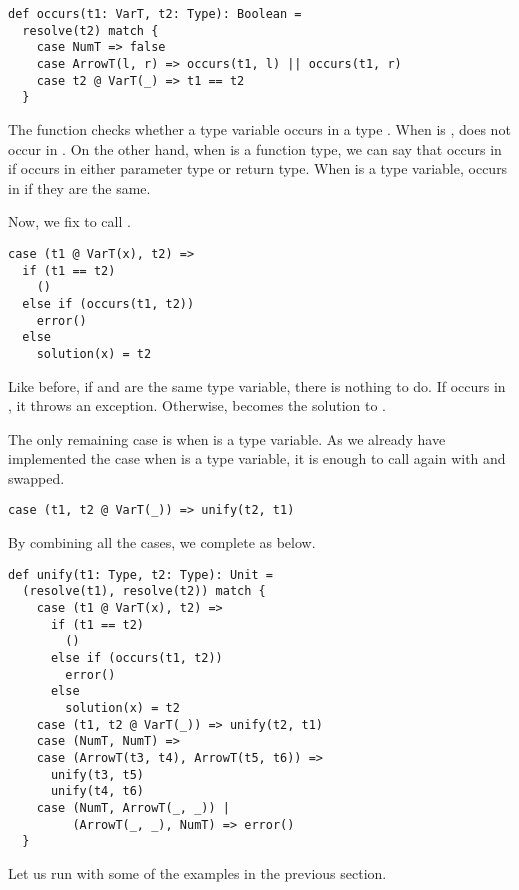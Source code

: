 \begin{verbatim}
def occurs(t1: VarT, t2: Type): Boolean =
  resolve(t2) match {
    case NumT => false
    case ArrowT(l, r) => occurs(t1, l) || occurs(t1, r)
    case t2 @ VarT(_) => t1 == t2
  }
\end{verbatim}

The function checks whether a type variable  occurs in a type
.  When  is ,  does not occur in
. On the other hand, when  is a function type, we can say that
 occurs in  if  occurs in either parameter type or
return type. When  is a type variable,  occurs in  if
they are the same.

Now, we fix  to call .

\begin{verbatim}
case (t1 @ VarT(x), t2) =>
  if (t1 == t2)
    ()
  else if (occurs(t1, t2))
    error()
  else
    solution(x) = t2
\end{verbatim}

Like before, if  and  are the same type variable, there is
nothing to do. If  occurs in , it throws an exception.
Otherwise,  becomes the solution to .

The only remaining case is when  is a type variable. As we already have
implemented the case when  is a type variable, it is enough to call
 again with  and  swapped.

\begin{verbatim}
case (t1, t2 @ VarT(_)) => unify(t2, t1)
\end{verbatim}

By combining all the cases, we complete  as below.

\begin{verbatim}
def unify(t1: Type, t2: Type): Unit =
  (resolve(t1), resolve(t2)) match {
    case (t1 @ VarT(x), t2) =>
      if (t1 == t2)
        ()
      else if (occurs(t1, t2))
        error()
      else
        solution(x) = t2
    case (t1, t2 @ VarT(_)) => unify(t2, t1)
    case (NumT, NumT) =>
    case (ArrowT(t3, t4), ArrowT(t5, t6)) =>
      unify(t3, t5)
      unify(t4, t6)
    case (NumT, ArrowT(_, _)) |
         (ArrowT(_, _), NumT) => error()
  }
\end{verbatim}

Let us run  with some of the examples in the previous section.

